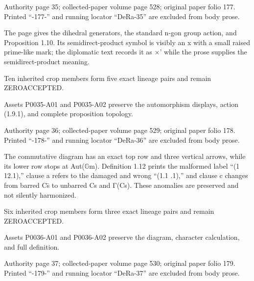 \documentclass[11pt,a4paper]{article}
\begin{document}
\par\medskip
\hypertarget{D018-P0035}{}
\par\smallskip
Authority page 35; collected-paper volume page 528; original paper folio 177. Printed “-177-” and running locator “DeRa-35” are excluded from body prose.

The page gives the dihedral generators, the standard n-gon group action, and Proposition 1.10. Its semidirect-product symbol is visibly an x with a small raised prime-like mark; the diplomatic text records it as ×' while the prose supplies the semidirect-product meaning.

Ten inherited crop members form five exact lineage pairs and remain ZERO\textunderscore{}ACCEPTED.

Assets P0035-A01 and P0035-A02 preserve the automorphism displays, action (1.9.1), and complete proposition topology.


\par\medskip
\hypertarget{D018-P0036}{}
\par\smallskip
Authority page 36; collected-paper volume page 529; original paper folio 178. Printed “-178-” and running locator “DeRa-36” are excluded from body prose.

The commutative diagram has an exact top row and three vertical arrows, while its lower row stops at Aut(\ensuremath{\mathbb{G}}\textunderscore{}m). Definition 1.12 prints the malformed label “(1 12.1),” clause a refers to the damaged and wrong “(1.1 .1),” and clause c changes from barred C\textunderscore{}s̄ to unbarred C\textunderscore{}s and Γ(C\textunderscore{}s). These anomalies are preserved and not silently harmonized.

Six inherited crop members form three exact lineage pairs and remain ZERO\textunderscore{}ACCEPTED.

Assets P0036-A01 and P0036-A02 preserve the diagram, character calculation, and full definition.


\par\medskip
\hypertarget{D018-P0037}{}
\par\smallskip
Authority page 37; collected-paper volume page 530; original paper folio 179. Printed “-179-” and running locator “DeRa-37” are excluded from body prose.
\end{document}

